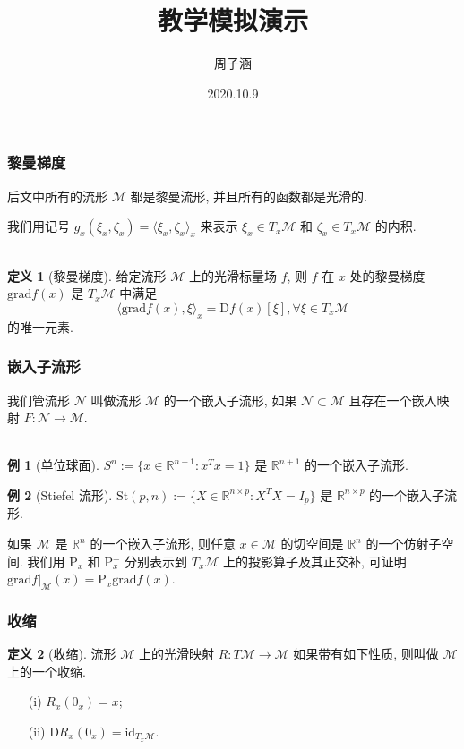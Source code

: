 \documentclass[notheorems,envcountsect,UTF8,pdfpagemode=FullScreen]{ctexbeamer}
\title{教学模拟演示}
\author{周子涵}
\institute{2020222010020}
\date{2020.10.9}
\theoremstyle{plain}
\theoremstyle{definition}
\newtheorem{definition}{定义}
\theoremstyle{example}
\newtheorem{example}{例}
\begin{document}
\begin{frame}
\maketitle
\end{frame}

\begin{frame}
\frametitle{黎曼梯度}
\qquad 后文中所有的流形 $\mathcal{M}$ 都是黎曼流形, 并且所有的函数都是光滑的.\par
\qquad 我们用记号 $g_x(\xi_x,\zeta_x)=\langle\xi_x,\zeta_x\rangle_x$ 来表示 $\xi_x\in T_x\mathcal{M}$ 和 $\zeta_x\in T_x\mathcal{M}$ 的内积.
\\~\\
\begin{definition}[黎曼梯度]
给定流形 $\mathcal{M}$ 上的光滑标量场 $f$, 则 $f$ 在 $x$ 处的黎曼梯度 $\mathrm{grad}f(x)$ 是 $T_x\mathcal{M}$ 中满足
$$\langle\mathrm{grad}f(x),\xi\rangle_x=\mathrm{D}f(x)[\xi], \forall \xi\in T_x\mathcal{M}$$
的唯一元素.
\end{definition}
\end{frame}

\begin{frame}
\frametitle{嵌入子流形}
\qquad 我们管流形 $\mathcal{N}$ 叫做流形 $\mathcal{M}$ 的一个嵌入子流形, 如果 $\mathcal{N}\subset\mathcal{M}$ 且存在一个嵌入映射 $F:\mathcal{N}\to\mathcal{M}$.
\\~\\
\begin{example}[单位球面]
$S^n:=\{x\in\mathbb{R}^{n+1}:x^Tx=1\}$ 是 $\mathbb{R}^{n+1}$ 的一个嵌入子流形.
\end{example}
\begin{example}[Stiefel 流形]
$\mathrm{St}(p,n):=\{X\in\mathbb{R}^{n\times p}:X^TX=I_p\}$ 是 $\mathbb{R}^{n\times p}$ 的一个嵌入子流形.
\end{example}

\qquad 如果 $\mathcal{M}$ 是 $\mathbb{R}^n$ 的一个嵌入子流形, 则任意 $x\in\mathcal{M}$ 的切空间是 $\mathbb{R}^n$ 的一个仿射子空间. 我们用 $\mathrm{P}_x$ 和 $\mathrm{P}^\perp_x$ 分别表示到 $T_x\mathcal{M}$ 上的投影算子及其正交补, 可证明 $\mathrm{grad}f|_{\mathcal{M}}(x)=\mathrm{P}_x\mathrm{grad}f(x)$.
\end{frame}


\begin{frame}
\frametitle{收缩}
\begin{definition}[收缩]
流形 $\mathcal{M}$ 上的光滑映射 $R:T\mathcal{M}\to\mathcal{M}$ 如果带有如下性质, 则叫做 $\mathcal{M}$ 上的一个收缩.
\begin{itemize}
\item[(i)] $R_x(0_x)=x$;
\item[(ii)] $\mathrm{D}R_x(0_x)=\mathrm{id}_{T_x\mathcal{M}}$.
\end{itemize}
\end{definition}
\end{frame}
\end{document}
